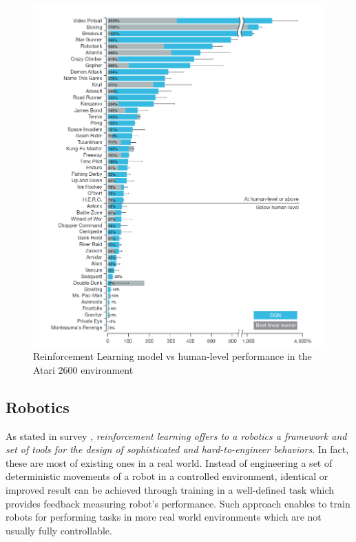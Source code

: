 \begin{figure}[h]
\includegraphics[width=14cm]{img/Atari2600.png}
\caption{Reinforcement Learning model vs human-level performance in the Atari 2600 environment \cite{DQNAtari}}
\label{fig:Atari2600}
\centering
\end{figure}

\subsection{Robotics}
\label{sub:intro-robotics}
As stated in survey \cite{RNSurvey}, \emph{reinforcement learning offers to a robotics a framework and set of tools for the design of sophisticated and hard-to-engineer behaviors}. In fact, these are most of existing ones in a real world. Instead of engineering a set of deterministic movements of a robot in a controlled environment, identical or improved result can be achieved through training in a well-defined task which provides feedback measuring robot's performance. Such approach enables to train robots for performing tasks in more real world environments which are not usually fully controllable. 

